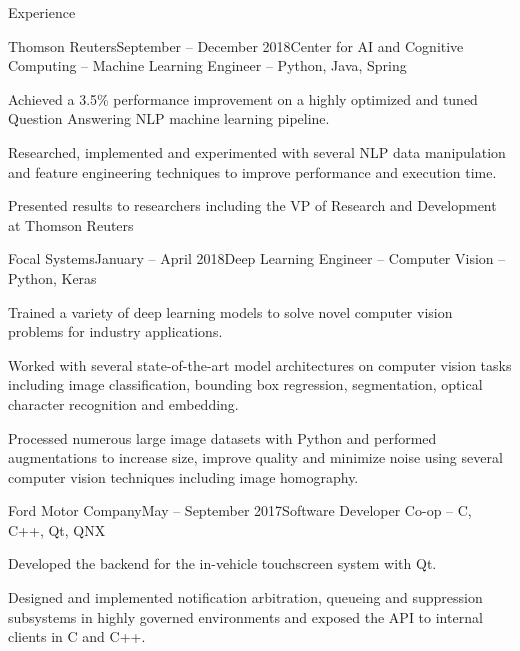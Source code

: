 \documentclass{resume} %
\begin{document}
\begin{rSection}{Experience}

\begin{rSubsection}{Thomson Reuters}{September -- December 2018}{Center for AI and Cognitive Computing -- Machine Learning Engineer -- Python, Java, Spring}{}
\item Achieved a 3.5\% performance improvement on a highly optimized and tuned Question Answering NLP machine learning pipeline.

\item Researched, implemented and experimented with several NLP data manipulation and feature engineering techniques to improve performance and execution time.
\item Presented results to researchers including the 
VP of Research and Development at Thomson Reuters
\end{rSubsection}

\begin{rSubsection}{Focal Systems}{January -- April 2018}{Deep Learning Engineer -- Computer Vision -- Python, Keras}{}
	\item Trained a variety of deep learning models to solve novel computer vision problems for industry applications.
	
		\item Worked with several state-of-the-art model architectures on computer vision tasks including image classification, bounding box regression, segmentation, optical character recognition and embedding.
	\item Processed numerous large image datasets with Python and performed augmentations to increase size, improve quality and minimize noise using several computer vision techniques including image homography.
\end{rSubsection}

\begin{rSubsection}{Ford Motor Company}{May -- September 2017}{Software Developer Co-op -- C, C++, Qt, QNX}{}

\item Developed the backend for the in-vehicle touchscreen system with Qt. 
\item Designed and implemented notification arbitration, queueing and suppression subsystems in highly governed environments and exposed the API to internal clients in C and C++.


\end{rSubsection}
\end{rSection}
\end{document}
